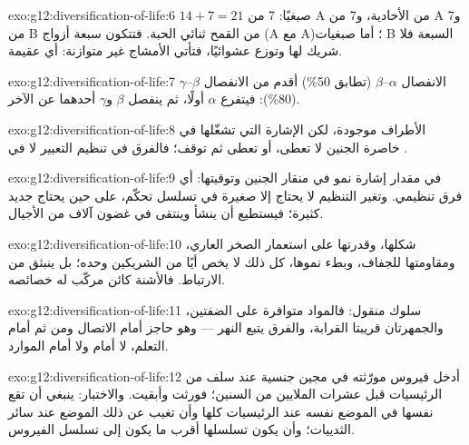 \begin{solution}{exo:g12:diversification-of-life:6}
$14 + 7 = 21$ صبغيًا: 7 من A من الأحادية، و7 من A و7 من B من القمح
ثنائي الحبة. فتتكون سبعة أزواج (A مع A)؛ أما صبغيات B السبعة فلا شريك
لها وتوزع عشوائيًا، فتأتي الأمشاج غير متوازنة: أي عقيمة.
\end{solution}

\begin{solution}{exo:g12:diversification-of-life:7}
الانفصال $\alpha$--$\beta$ (تطابق 50\%) أقدم من الانفصال
$\beta$--$\gamma$ (80\%): فيتفرع $\alpha$ أولًا، ثم ينفصل $\beta$
و$\gamma$ أحدهما عن الآخر.
\end{solution}

\begin{solution}{exo:g12:diversification-of-life:8}
 الأطراف موجودة، لكن الإشارة التي تشغّلها في خاصرة الجنين لا
تعطى، أو تعطى ثم توقف؛ فالفرق في تنظيم التعبير لا في .
\end{solution}

\begin{solution}{exo:g12:diversification-of-life:9}
في مقدار إشارة نمو في منقار الجنين وتوقيتها: أي فرق تنظيمي. وتغير
التنظيم لا يحتاج إلا  صغيرة في تسلسل تحكّم، على حين يحتاج 
جديد  كثيرة؛ فيستطيع أن ينشأ وينتقى في غضون آلاف من الأجيال.
\end{solution}

\begin{solution}{exo:g12:diversification-of-life:10}
شكلها، وقدرتها على استعمار الصخر العاري، ومقاومتها للجفاف، وبطء نموها،
كل ذلك لا يخص أيًا من الشريكين وحده؛ بل ينبثق من الارتباط. فالأشنة كائن
مركّب له خصائصه.
\end{solution}

\begin{solution}{exo:g12:diversification-of-life:11}
سلوك منقول: فالمواد متوافرة على الضفتين، والجمهرتان قريبتا القرابة،
والفرق يتبع النهر --- وهو حاجز أمام الاتصال ومن ثم أمام التعلم، لا
أمام  ولا أمام الموارد.
\end{solution}

\begin{solution}{exo:g12:diversification-of-life:12}
أدخل فيروس مورّثته في مجين  جنسية عند سلف من الرئيسيات قبل عشرات
الملايين من السنين؛ فورثت  وأبقيت. والاختبار: ينبغي أن تقع
 نفسها في الموضع  نفسه عند الرئيسيات كلها وأن تغيب عن
ذلك الموضع عند سائر الثدييات؛ وأن يكون تسلسلها أقرب ما يكون إلى تسلسل
الفيروس.
\end{solution}

